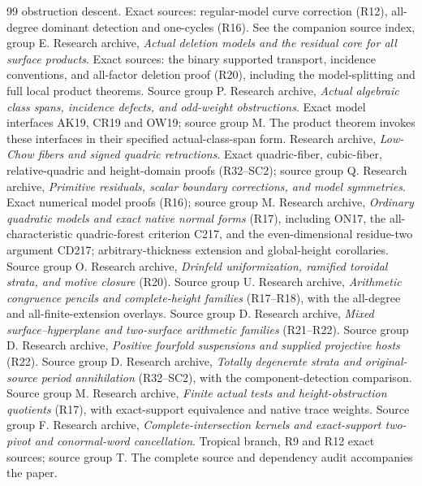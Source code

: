 \documentclass[11pt,a4paper]{article}
\theoremstyle{definition}
\theoremstyle{remark}\newtheorem{remark}[theorem]{Remark}
\numberwithin{equation}{section}
\begin{document}
\begin{thebibliography}{99}
{obstruction descent}. Exact sources: regular-model curve correction
(R12), all-degree dominant detection and one-cycles (R16).
See the companion source index, group E.
 Research archive,
\emph{Actual deletion models and the residual core for all surface
products}. Exact sources: the binary supported transport, incidence
conventions, and all-factor deletion proof (R20), including the
model-splitting and full local product theorems. Source group P.
 Research archive,
\emph{Actual algebraic class spans, incidence defects, and odd-weight
obstructions}. Exact model interfaces AK19, CR19 and OW19;
source group M. The product theorem invokes these interfaces in
their specified actual-class-span form.
 Research archive,
\emph{Low-Chow fibers and signed quadric retractions}. Exact
quadric-fiber, cubic-fiber, relative-quadric and height-domain
proofs (R32--SC2); source group Q.
 Research archive,
\emph{Primitive residuals, scalar boundary corrections, and model
symmetries}. Exact numerical model proofs (R16); source group M.
 Research archive,
\emph{Ordinary quadratic models and exact native normal forms}
(R17), including ON17, the all-characteristic quadric-forest criterion
C217, and the even-dimensional residue-two argument CD217;
arbitrary-thickness extension and global-height
corollaries. Source group O.
 Research archive,
\emph{Drinfeld uniformization, ramified toroidal strata, and motive
closure} (R20). Source group U.
 Research archive,
\emph{Arithmetic congruence pencils and complete-height families}
(R17--R18), with the all-degree and all-finite-extension overlays.
Source group D.
 Research archive,
\emph{Mixed surface--hyperplane and two-surface arithmetic
families} (R21--R22). Source group D.
 Research archive,
\emph{Positive fourfold suspensions and supplied projective hosts}
(R22). Source group D.
 Research archive,
\emph{Totally degenerate strata and original-source period
annihilation} (R32--SC2), with the component-detection comparison.
Source group M.
 Research archive,
\emph{Finite actual tests and height-obstruction quotients}
(R17), with exact-support equivalence and native trace weights.
Source group F.
 Research archive,
\emph{Complete-intersection kernels and exact-support
two-pivot and conormal-word cancellation}. Tropical branch,
R9 and R12 exact sources; source group T. The complete source
and dependency audit accompanies the paper.



\end{thebibliography}
\end{document}
